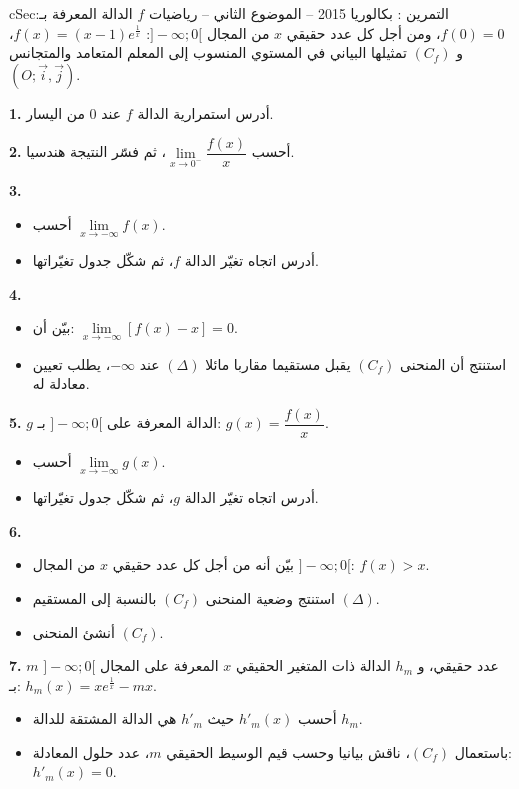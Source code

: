 \documentclass[12pt,a4paper]{article}
\newenvironment{BOX}[2]{\begin{otherlanguage}{english}\begin{arbox}{#1}{#2}}{\end{arbox}\end{otherlanguage}}
\newcounter{exo}
\newenvironment{tamrin}[1]{\stepcounter{exo}\begin{BOX}{cSec}{التمرين \theexo: #1}}{\end{BOX}}
\newenvironment{sq}{\begin{itemize}[leftmargin=2.4em,itemsep=3pt]}{\end{itemize}}
\newcommand{\qa}{\item[(أ)]}\newcommand{\qb}{\item[(ب)]}\newcommand{\qc}{\item[(جـ)]}\newcommand{\qd}{\item[(د)]}\newcommand{\qe}{\item[(هـ)]}
\newcommand{\QQ}[1]{\par\smallskip\textbf{#1.} }
\begin{document}
\begin{tamrin}{بكالوريا 2015 -- الموضوع الثاني -- رياضيات}
$f$ الدالة المعرفة بـ: $f(0)=0$، ومن أجل كل عدد حقيقي $x$ من المجال $]{-}\infty;0[$: $f(x)=(x-1)e^{\frac1x}$،
و $(C_f)$ تمثيلها البياني في المستوي المنسوب إلى المعلم المتعامد والمتجانس $(O;\vec i,\vec j)$.
\QQ{1} أدرس استمرارية الدالة $f$ عند $0$ من اليسار.
\QQ{2} أحسب $\lim\limits_{x\to0^-}\dfrac{f(x)}{x}$، ثم فسّر النتيجة هندسيا.
\QQ{3}
\begin{sq}
\qa أحسب $\lim\limits_{x\to-\infty}f(x)$.
\qb أدرس اتجاه تغيّر الدالة $f$، ثم شكّل جدول تغيّراتها.
\end{sq}
\QQ{4}
\begin{sq}
\qa بيّن أن: $\lim\limits_{x\to-\infty}\left[f(x)-x\right]=0$.
\qb استنتج أن المنحنى $(C_f)$ يقبل مستقيما مقاربا مائلا $(\Delta)$ عند $-\infty$، يطلب تعيين معادلة له.
\end{sq}
\QQ{5} $g$ الدالة المعرفة على $]{-}\infty;0[$ بـ: $g(x)=\dfrac{f(x)}{x}$.
\begin{sq}
\qa أحسب $\lim\limits_{x\to-\infty}g(x)$.
\qb أدرس اتجاه تغيّر الدالة $g$، ثم شكّل جدول تغيّراتها.
\end{sq}
\QQ{6}
\begin{sq}
\qa بيّن أنه من أجل كل عدد حقيقي $x$ من المجال $]{-}\infty;0[$: $f(x)>x$.
\qb استنتج وضعية المنحنى $(C_f)$ بالنسبة إلى المستقيم $(\Delta)$.
\qc أنشئ المنحنى $(C_f)$.
\end{sq}
\QQ{7} $m$ عدد حقيقي، و $h_m$ الدالة ذات المتغير الحقيقي $x$ المعرفة على المجال $]{-}\infty;0[$ بـ: $h_m(x)=xe^{\frac1x}-mx$.
\begin{sq}
\qa أحسب $h'_m(x)$ حيث $h'_m$ هي الدالة المشتقة للدالة $h_m$.
\qb باستعمال $(C_f)$، ناقش بيانيا وحسب قيم الوسيط الحقيقي $m$، عدد حلول المعادلة: $h'_m(x)=0$.
\end{sq}
\end{tamrin}
\end{document}
